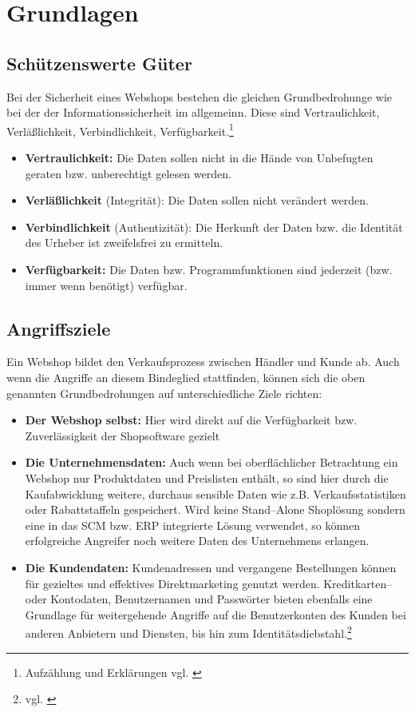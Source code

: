 \section{Grundlagen}
\label{sec:grundlagen}

\subsection{Schützenswerte Güter}

Bei der Sicherheit eines Webshops bestehen die gleichen Grundbedrohunge wie bei der der Informationssicherheit im allgemeinn. Diese sind 
Vertraulichkeit, Verläßlichkeit, Verbindlichkeit, Verfügbarkeit.\footnote{Aufzählung und Erklärungen vgl. \cite{bbds}}

\begin{itemize}
	\item \textbf{Vertraulichkeit:} Die Daten sollen nicht in die Hände von Unbefugten geraten bzw. unberechtigt gelesen werden.
	\item \textbf{Verläßlichkeit} (Integrität): Die Daten sollen nicht verändert werden.
	\item \textbf{Verbindlichkeit} (Authentizität): Die Herkunft der Daten bzw. die Identität des Urheber ist zweifelsfrei zu ermitteln.
	\item \textbf{Verfügbarkeit:} Die Daten bzw. Programmfunktionen sind jederzeit (bzw. immer wenn benötigt) verfügbar. 
\end{itemize}


\subsection{Angriffsziele}

Ein Webshop bildet den Verkaufsprozess zwischen Händler und Kunde ab. Auch wenn die Angriffe an diesem Bindeglied stattfinden, können sich 
die oben genannten Grundbedrohungen auf unterschiedliche Ziele richten:

\begin{itemize}
	\item \textbf{Der Webshop selbst:} Hier wird direkt auf die Verfügbarkeit bzw. Zuverlässigkeit der Shopsoftware gezielt
	\item \textbf{Die Unternehmensdaten:} Auch wenn bei oberflächlicher Betrachtung ein Webshop nur Produktdaten und Preislisten enthält, so sind hier durch die Kaufabwicklung weitere, durchaus sensible Daten wie z.B. Verkaufsstatistiken oder Rabattstaffeln gespeichert. Wird keine Stand--Alone Shoplösung sondern eine in das \ac{SCM} bzw. \ac{ERP} integrierte Lösung verwendet, so können erfolgreiche Angreifer noch weitere Daten des Unternehmens erlangen.  
	\item \textbf{Die Kundendaten:} Kundenadressen und vergangene Bestellungen können für gezieltes und effektives Direktmarketing genutzt werden. Kreditkarten-- oder Kontodaten, Benutzernamen und Passwörter bieten ebenfalls eine Grundlage für weitergehende Angriffe auf die Benutzerkonten des Kunden bei anderen Anbietern und Diensten, bis hin zum Identitätsdiebstahl.\footnote{vgl. \cite{vodafone}}
\end{itemize}


